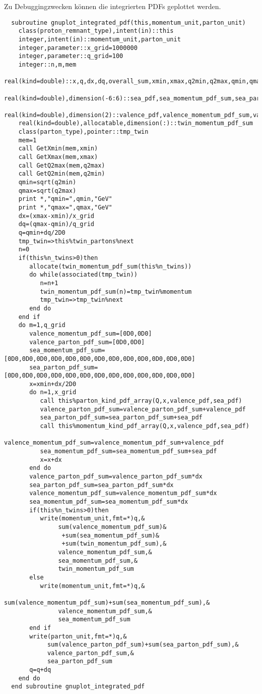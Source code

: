 Zu Debuggingzwecken können die integrierten PDFs geplottet werden.
\begin{Verbatim}
  subroutine gnuplot_integrated_pdf(this,momentum_unit,parton_unit)
    class(proton_remnant_type),intent(in)::this
    integer,intent(in)::momentum_unit,parton_unit
    integer,parameter::x_grid=1000000
    integer,parameter::q_grid=100
    integer::n,m,mem
    real(kind=double)::x,q,dx,dq,overall_sum,xmin,xmax,q2min,q2max,qmin,qmax
    real(kind=double),dimension(-6:6)::sea_pdf,sea_momentum_pdf_sum,sea_parton_pdf_sum
    real(kind=double),dimension(2)::valence_pdf,valence_momentum_pdf_sum,valence_parton_pdf_sum
    real(kind=double),allocatable,dimension(:)::twin_momentum_pdf_sum
    class(parton_type),pointer::tmp_twin
    mem=1
    call GetXmin(mem,xmin)
    call GetXmax(mem,xmax)
    call GetQ2max(mem,q2max)
    call GetQ2min(mem,q2min)
    qmin=sqrt(q2min)
    qmax=sqrt(q2max)
    print *,"qmin=",qmin,"GeV"
    print *,"qmax=",qmax,"GeV"
    dx=(xmax-xmin)/x_grid
    dq=(qmax-qmin)/q_grid
    q=qmin+dq/2D0
    tmp_twin=>this%twin_partons%next
    n=0
    if(this%n_twins>0)then
       allocate(twin_momentum_pdf_sum(this%n_twins))
       do while(associated(tmp_twin))
          n=n+1
          twin_momentum_pdf_sum(n)=tmp_twin%momentum
          tmp_twin=>tmp_twin%next
       end do
    end if
    do m=1,q_grid
       valence_momentum_pdf_sum=[0D0,0D0]
       valence_parton_pdf_sum=[0D0,0D0]
       sea_momentum_pdf_sum=[0D0,0D0,0D0,0D0,0D0,0D0,0D0,0D0,0D0,0D0,0D0,0D0,0D0]    
       sea_parton_pdf_sum=[0D0,0D0,0D0,0D0,0D0,0D0,0D0,0D0,0D0,0D0,0D0,0D0,0D0]    
       x=xmin+dx/2D0
       do n=1,x_grid
          call this%parton_kind_pdf_array(Q,x,valence_pdf,sea_pdf)
          valence_parton_pdf_sum=valence_parton_pdf_sum+valence_pdf
          sea_parton_pdf_sum=sea_parton_pdf_sum+sea_pdf
          call this%momentum_kind_pdf_array(Q,x,valence_pdf,sea_pdf)
          valence_momentum_pdf_sum=valence_momentum_pdf_sum+valence_pdf
          sea_momentum_pdf_sum=sea_momentum_pdf_sum+sea_pdf
          x=x+dx
       end do
       valence_parton_pdf_sum=valence_parton_pdf_sum*dx
       sea_parton_pdf_sum=sea_parton_pdf_sum*dx
       valence_momentum_pdf_sum=valence_momentum_pdf_sum*dx
       sea_momentum_pdf_sum=sea_momentum_pdf_sum*dx
       if(this%n_twins>0)then
          write(momentum_unit,fmt=*)q,&
               sum(valence_momentum_pdf_sum)&
                +sum(sea_momentum_pdf_sum)&
                +sum(twin_momentum_pdf_sum),&
               valence_momentum_pdf_sum,&
               sea_momentum_pdf_sum,&
               twin_momentum_pdf_sum
       else
          write(momentum_unit,fmt=*)q,&
               sum(valence_momentum_pdf_sum)+sum(sea_momentum_pdf_sum),&
               valence_momentum_pdf_sum,&
               sea_momentum_pdf_sum
       end if
       write(parton_unit,fmt=*)q,&
            sum(valence_parton_pdf_sum)+sum(sea_parton_pdf_sum),&
            valence_parton_pdf_sum,&
            sea_parton_pdf_sum
       q=q+dq
    end do
  end subroutine gnuplot_integrated_pdf
\end{Verbatim}

